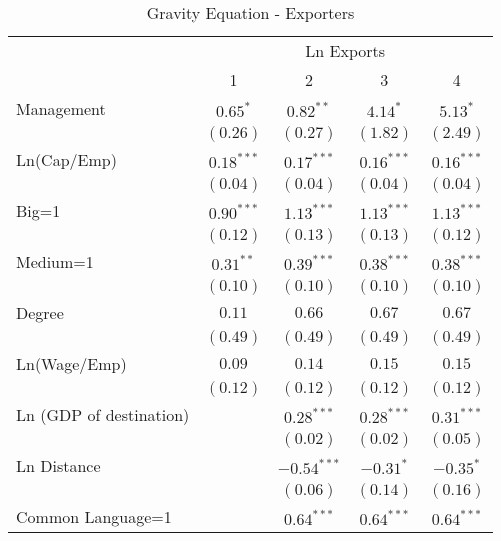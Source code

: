 \documentclass{article}
\begin{document}
\begin{table}
\caption{Gravity Equation - Exporters}
\begin{center}
\begin{normalsize}
\begin{tabular}{l c c c c}
\hline
 & \multicolumn{4}{c}{Ln Exports} \\
\cline{2-5}
 & 1 & 2 & 3 & 4 \\
\hline
Management              & $0.65^{*}$   & $0.82^{**}$   & $4.14^{*}$   & $5.13^{*}$   \\
                        & $(0.26)$     & $(0.27)$      & $(1.82)$     & $(2.49)$     \\
Ln(Cap/Emp)             & $0.18^{***}$ & $0.17^{***}$  & $0.16^{***}$ & $0.16^{***}$ \\
                        & $(0.04)$     & $(0.04)$      & $(0.04)$     & $(0.04)$     \\
Big=1                   & $0.90^{***}$ & $1.13^{***}$  & $1.13^{***}$ & $1.13^{***}$ \\
                        & $(0.12)$     & $(0.13)$      & $(0.13)$     & $(0.12)$     \\
Medium=1                & $0.31^{**}$  & $0.39^{***}$  & $0.38^{***}$ & $0.38^{***}$ \\
                        & $(0.10)$     & $(0.10)$      & $(0.10)$     & $(0.10)$     \\
Degree                  & $0.11$       & $0.66$        & $0.67$       & $0.67$       \\
                        & $(0.49)$     & $(0.49)$      & $(0.49)$     & $(0.49)$     \\
Ln(Wage/Emp)            & $0.09$       & $0.14$        & $0.15$       & $0.15$       \\
                        & $(0.12)$     & $(0.12)$      & $(0.12)$     & $(0.12)$     \\
Ln (GDP of destination) &              & $0.28^{***}$  & $0.28^{***}$ & $0.31^{***}$ \\
                        &              & $(0.02)$      & $(0.02)$     & $(0.05)$     \\
Ln Distance             &              & $-0.54^{***}$ & $-0.31^{*}$  & $-0.35^{*}$  \\
                        &              & $(0.06)$      & $(0.14)$     & $(0.16)$     \\
Common Language=1       &              & $0.64^{***}$  & $0.64^{***}$ & $0.64^{***}$ \\

\end{tabular}
\end{normalsize}
\end{center}
\end{table}
\end{document}
